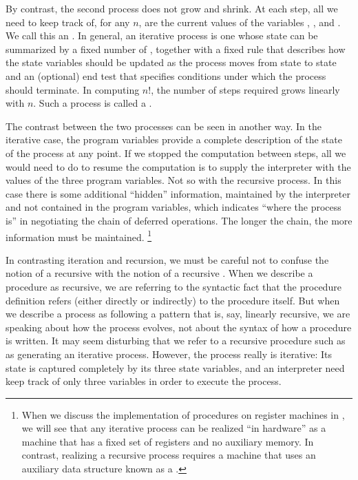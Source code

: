 By contrast, the second process does not grow and shrink.
At each step, all we need to keep track of, for any \( n \), are the current values of the variables , , and .
We call this an .
In general, an iterative process is one whose state can be summarized by a fixed number of , together with a fixed rule that describes how the state variables should be updated as the process moves from state to state and an (optional) end test that specifies conditions under which the process should terminate.
In computing \( n! \), the number of steps required grows linearly with \( n \).
Such a process is called a .

The contrast between the two processes can be seen in another way.
In the iterative case, the program variables provide a complete description of the state of the process at any point.
If we stopped the computation between steps, all we would need to do to resume the computation is to supply the interpreter with the values of the three program variables.
Not so with the recursive process.
In this case there is some additional “hidden” information, maintained by the interpreter and not contained in the program variables, which indicates “where the process is” in negotiating the chain of deferred operations.
The longer the chain, the more information must be maintained.%
\footnote{
	When we discuss the implementation of procedures on register machines in , we will see that any iterative process can be realized “in hardware” as a machine that has a fixed set of registers and no auxiliary memory.
	In contrast, realizing a recursive process requires a machine that uses an auxiliary data structure known as a .
}

In contrasting iteration and recursion, we must be careful not to confuse the notion of a recursive  with the notion of a recursive .
When we describe a procedure as recursive, we are referring to the syntactic fact that the procedure definition refers (either directly or indirectly) to the procedure itself.
But when we describe a process as following a pattern that is, say, linearly recursive, we are speaking about how the process evolves, not about the syntax of how a procedure is written.
It may seem disturbing that we refer to a recursive procedure such as  as generating an iterative process.
However, the process really is iterative:
Its state is captured completely by its three state variables, and an interpreter need keep track of only three variables in order to execute the process.


